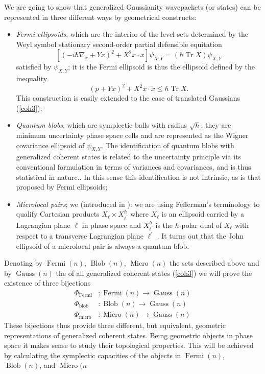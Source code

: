 \documentclass[11pt]{article}%
\begin{document}
We are going to show that generalized Gaussianity wavepackets (or states) can
be represented in three different ways by geometrical constructs:

\begin{itemize}
\item \textit{Fermi ellipsoids}, which are the interior of the level sets
determined by the Weyl symbol stationary second-order partial defensible
equitation
\[
\left[  (-i\hbar\nabla_{x}+Yx)^{2}+X^{2}x\cdot x\right]  \psi_{X,Y}%
=(\hbar\operatorname*{Tr}X)\psi_{X,Y}%
\]
satisfied by $\psi_{X,Y}$; it is the Fermi ellipsoid is thus the ellipsoid
defined by the inequality
\[
(p+Yx)^{2}+X^{2}x\cdot x\leq\hbar\operatorname*{Tr}X.
\]
This construction is easily extended to the case of translated Gaussians
(\ref{coh3});

\item \textit{Quantum blobs}, which are symplectic balls with radius
$\sqrt{\hbar}$; they are minimum uncertainty phase space cells and are
represented as the Wigner covariance ellipsoid of $\psi_{X,Y}$. The
identification of quantum blobs with generalized coherent states is related to
the uncertainty principle via its conventional formulation in terms of
variances and covariances, and is thus statistical in nature.. In this sense
this identification is not intrinsic, as is that proposed by Fermi ellipsoids;

\item \textit{Microlocal pairs}; we (introduced in \cite{Poiuntilliswme}): we
are using Fefferman's terminology \cite{Fefferman} to qualify Cartesian
products $X_{\ell}\times X_{\ell^{\prime}}^{\hbar}$ where $X_{\ell}$ is an
ellipsoid carried by a Lagrangian plane $\ell$ in phase space and
$X_{\ell^{\prime}}^{\hbar}$ is the $\hbar$-polar dual of $X_{\ell}$ with
respect to a transverse Lagrangian plane $\ell^{\prime}$ . It turns out that
the John ellipsoid of a microlocal pair is always a quantum blob.
\end{itemize}

Denoting by $\operatorname{Fermi}(n)$, $\operatorname*{Blob}(n)$,
$\operatorname{Micro}(n)$ the sets described above and by
$\operatorname*{Gauss}(n)$ the of all generalized coherent states (\ref{coh3})
we will prove the existence of three bijections
\begin{align*}
\Phi_{\operatorname{Fermi}}  &  :\operatorname{Fermi}(n)\longrightarrow
\operatorname*{Gauss}(n)\\
\Phi_{\mathrm{blob}}  &  :\operatorname*{Blob}(n)\longrightarrow
\operatorname*{Gauss}(n)\\
\Phi_{\mathrm{micro}}  &  :\operatorname{Micro}(n)\longrightarrow
\operatorname*{Gauss}(n)
\end{align*}
These bijections thus provide three different, but equivalent, geometric
representations of generalized coherent states. Being geometric objects in
phase space it makes sense to study their topological properties. This will be
achieved by calculating the symplectic capacities of the objects in
$\operatorname{Fermi}(n)$, $\operatorname*{Blob}(n)$, and
$\operatorname{Micro}(n$
\end{document}
